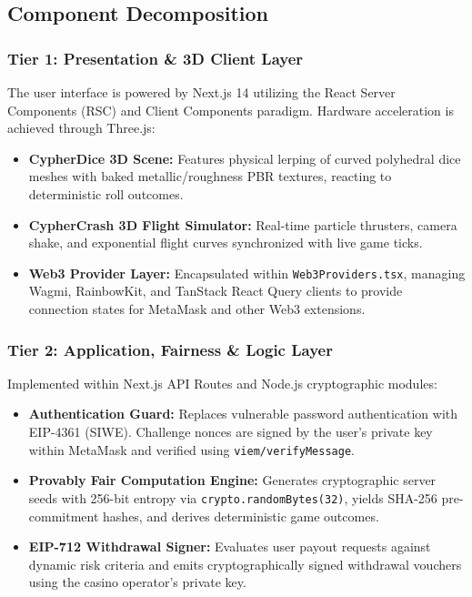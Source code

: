 \subsection{Component Decomposition}

\subsubsection{Tier 1: Presentation \& 3D Client Layer}
The user interface is powered by Next.js 14 utilizing the React Server Components (RSC) and Client Components paradigm. Hardware acceleration is achieved through Three.js:
\begin{itemize}[leftmargin=1.5em]
    \item \textbf{CypherDice 3D Scene:} Features physical lerping of curved polyhedral dice meshes with baked metallic/roughness PBR textures, reacting to deterministic roll outcomes.
    \item \textbf{CypherCrash 3D Flight Simulator:} Real-time particle thrusters, camera shake, and exponential flight curves synchronized with live game ticks.
    \item \textbf{Web3 Provider Layer:} Encapsulated within \texttt{Web3Providers.tsx}, managing Wagmi, RainbowKit, and TanStack React Query clients to provide connection states for MetaMask and other Web3 extensions.
\end{itemize}

\subsubsection{Tier 2: Application, Fairness \& Logic Layer}
Implemented within Next.js API Routes and Node.js cryptographic modules:
\begin{itemize}[leftmargin=1.5em]
    \item \textbf{Authentication Guard:} Replaces vulnerable password authentication with EIP-4361 (SIWE). Challenge nonces are signed by the user's private key within MetaMask and verified using \texttt{viem/verifyMessage}.
    \item \textbf{Provably Fair Computation Engine:} Generates cryptographic server seeds with 256-bit entropy via \texttt{crypto.randomBytes(32)}, yields SHA-256 pre-commitment hashes, and derives deterministic game outcomes.
    \item \textbf{EIP-712 Withdrawal Signer:} Evaluates user payout requests against dynamic risk criteria and emits cryptographically signed withdrawal vouchers using the casino operator's private key.
\end{itemize}

